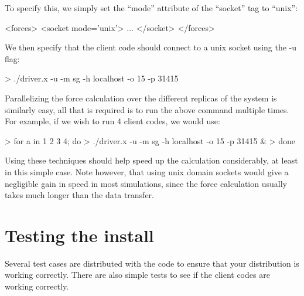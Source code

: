\documentclass[11pt,english,fleqn]{report}
\newenvironment{code}{%
\footnotesize 
\verbatim
}{
\endverbatim
\normalsize
}
\begin{document}
To specify this, we simply set the {}``mode'' attribute of the
{}``socket'' tag to {}``unix'':

\begin{code}
<forces>
   <socket mode='unix'>
      ...
   </socket>
</forces>
\end{code}

We then specify that the client code should connect to a unix socket
using the -u flag:

\begin{code}
> ./driver.x -u -m sg -h localhost -o 15 -p 31415
\end{code}

Parallelizing the force calculation over the different replicas of the system
is similarly easy, all that is required is to run the above
command multiple times. For example, if we wish to run
4 client codes, we would use:

\begin{code}
> for a in 1 2 3 4; do
>    ./driver.x -u -m sg -h localhost -o 15 -p 31415 &
> done
\end{code}

Using these techniques should help speed up the calculation considerably,
at least in this simple case. Note however, that using unix domain sockets
would give a negligible gain in speed in most simulations, 
since the force calculation usually takes much longer than the data transfer. 

\section{Testing the install}

\label{tests}

Several test cases are distributed with the code to ensure that your
distribution is working correctly. There are also simple tests to
see if the client codes are working correctly.
\end{document}
